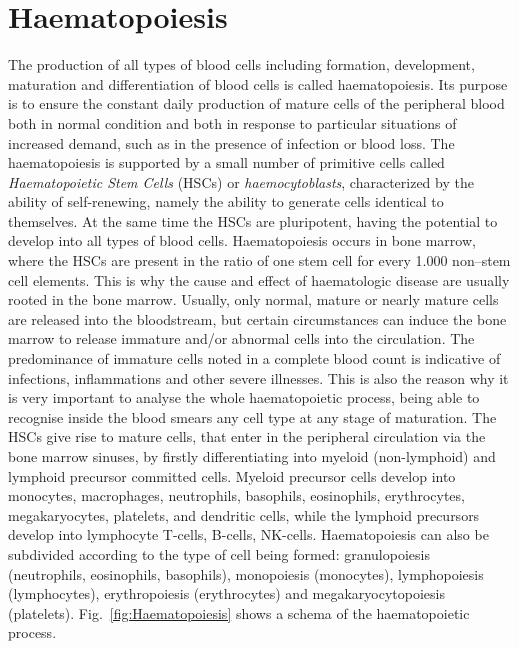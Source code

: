\documentclass[final,a4paper,12pt,english]{UnicaPhdThesis3}
\begin{document}

 


\appendix
\chapter{Haematopoiesis}\label{appendixA}
The production of all types of blood cells including formation, development, maturation and differentiation of blood cells is called haematopoiesis. Its purpose is to ensure the constant daily production of mature cells of the peripheral blood both in normal condition and both in response to particular situations of increased demand, such as in the presence of infection or blood loss. The haematopoiesis is supported by a small number of primitive cells called \textit{Haematopoietic Stem Cells} (\acs{HSC}s) or \textit{haemocytoblasts}, characterized by the ability of self-renewing, namely the ability to generate cells identical to themselves. At the same time the HSCs are pluripotent, having the potential to develop into all types of blood cells. Haematopoiesis occurs in bone marrow, where the HSCs are present in the ratio of one stem cell for every 1.000 non–stem cell elements. This is why the cause and effect of haematologic disease are usually rooted in the bone marrow. Usually, only normal, mature or nearly mature cells are released into the bloodstream, but certain circumstances can induce the bone marrow to release immature and/or abnormal cells into the circulation. The predominance of immature cells noted in a complete blood count is indicative of infections, inflammations and other severe illnesses. This is also the reason why it is very important to analyse the whole haematopoietic process, being able to recognise inside the blood smears any cell type at any stage of maturation. The HSCs give rise to mature cells, that enter in the peripheral circulation via the bone marrow sinuses, by firstly differentiating into myeloid (non-lymphoid) and lymphoid precursor committed cells. Myeloid precursor cells develop into monocytes, macrophages, neutrophils, basophils, eosinophils, erythrocytes, megakaryocytes, platelets, and dendritic cells, while the lymphoid precursors develop into lymphocyte T-cells, B-cells, NK-cells. Haematopoiesis can also be subdivided according to the type of cell being formed: granulopoiesis (neutrophils, eosinophils, basophils), monopoiesis (monocytes), lymphopoiesis (lymphocytes), erythropoiesis (erythrocytes) and megakaryocytopoiesis (platelets). Fig.~\ref{fig:Haematopoiesis} shows a schema of the haematopoietic process.
\end{document}
